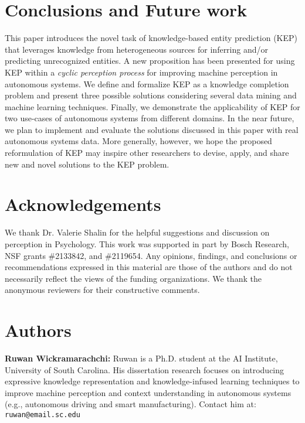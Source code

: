 \documentclass[conference]{IEEEtran}
\begin{document}
\section {Conclusions and Future work}
\label{sec:conclusion}

This paper introduces the novel task of knowledge-based entity prediction (KEP) that leverages knowledge from heterogeneous sources for inferring and/or predicting unrecognized entities. A new proposition has been presented for using KEP within a \textit{cyclic perception process} for improving machine perception in autonomous systems. We define and formalize KEP as a knowledge completion problem and present three possible solutions considering several data mining and machine learning techniques. Finally, we demonstrate the applicability of KEP for two use-cases of autonomous systems from different domains. In the near future, we plan to implement and evaluate the solutions discussed in this paper with real autonomous systems data. More generally, however, we hope the proposed reformulation of KEP may inspire other researchers to devise, apply, and share new and novel solutions to the KEP problem.


\section*{Acknowledgements}
We thank Dr. Valerie Shalin for the helpful suggestions and discussion on perception in Psychology. This work was supported in part by Bosch Research, NSF grants \#2133842, and \#2119654. Any opinions, findings, and conclusions or recommendations expressed in this material are those of the authors and do not necessarily reflect the views of the funding organizations. We thank the anonymous reviewers for their constructive comments.\\





\section*{Authors}

\noindent \textbf{Ruwan Wickramarachchi:} Ruwan is a Ph.D. student at the AI Institute, University of South Carolina. His dissertation research focuses on introducing expressive knowledge representation and knowledge-infused learning techniques to improve machine perception and context understanding in autonomous systems (e.g., autonomous driving and smart manufacturing). Contact him at: \texttt{ruwan@email.sc.edu} \\
\end{document}
